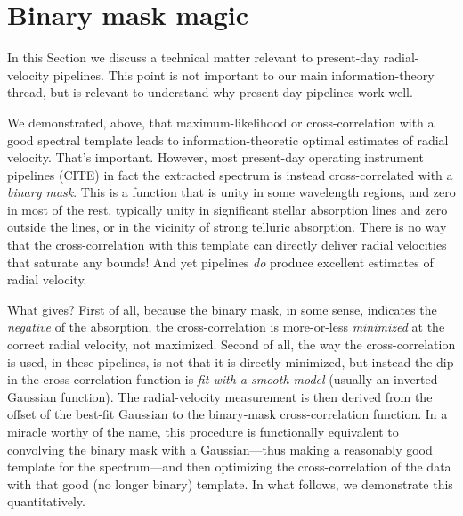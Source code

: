 \documentclass[modern]{aastex631}
\newcommand{\sectionname}{Section}
\begin{document}
\section{Binary mask magic}\label{sec:binary}

In this \sectionname{} we discuss a technical matter relevant to present-day radial-velocity pipelines.
This point is not important to our main information-theory thread, but is relevant to understand why present-day pipelines work well.

We demonstrated, above, that maximum-likelihood or cross-correlation with a good spectral template leads to information-theoretic optimal estimates of radial velocity.
That's important.
However, most present-day operating instrument pipelines (CITE) in fact the extracted spectrum is instead cross-correlated with a \emph{binary mask}.
This is a function that is unity in some wavelength regions, and zero in most of the rest, typically unity in significant stellar absorption lines and zero outside the lines, or in the vicinity of strong telluric absorption.
There is no way that the cross-correlation with this template can directly deliver radial velocities that saturate any bounds!
And yet pipelines \emph{do} produce excellent estimates of radial velocity.

What gives?
First of all, because the binary mask, in some sense, indicates the \emph{negative} of the absorption, the cross-correlation is more-or-less \emph{minimized} at the correct radial velocity, not maximized.
Second of all, the way the cross-correlation is used, in these pipelines, is not that it is directly minimized, but instead the dip in the cross-correlation function is \emph{fit with a smooth model} (usually an inverted Gaussian function).
The radial-velocity measurement is then derived from the offset of the best-fit Gaussian to the binary-mask cross-correlation function.
In a miracle worthy of the name, this procedure is functionally equivalent to convolving the binary mask with a Gaussian---thus making a reasonably good template for the spectrum---and then optimizing the cross-correlation of the data with that good (no longer binary) template.
In what follows, we demonstrate this quantitatively.
\end{document}
